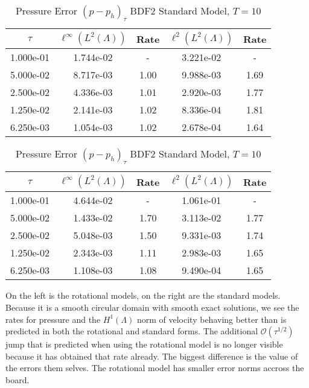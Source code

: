 \documentclass[letterpaper]{erdc}
\begin{document}
\begin{table}[h!]
  \parbox{.45\linewidth}{
  \tiny
  \centering
    \caption{Pressure Error $(p - p_h)_{\tau}$ BDF2 Rotational Model, $T=10$}
    \begin{tabular}{c|c|c|c|c}
      $\tau$ &  $\ell^{\infty}\left(L^2(\Lambda)\right)$ &  Rate  &  $\ell^2\left(L^2(\Lambda)\right)$  &  Rate\\
      \hline
      1.000e-01 & 1.744e-02 &   -  & 3.221e-02 &   - \\
      5.000e-02 & 8.717e-03 & 1.00 & 9.988e-03 & 1.69\\
      2.500e-02 & 4.336e-03 & 1.01 & 2.920e-03 & 1.77\\
      1.250e-02 & 2.141e-03 & 1.02 & 8.336e-04 & 1.81\\
      6.250e-03 & 1.054e-03 & 1.02 & 2.678e-04 & 1.64
    \end{tabular}
    }
    \hfill
    \parbox{.45\linewidth}{
    \tiny
    \centering
      \caption{Pressure Error $(p - p_h)_{\tau}$ BDF2 Standard Model, $T=10$}
      \begin{tabular}{c|c|c|c|c}\label{table:lastconvergenceresult}
        $\tau$ &  $\ell^{\infty}\left(L^2(\Lambda)\right)$ &  Rate  &  $\ell^2\left(L^2(\Lambda)\right)$  &  Rate\\
        \hline
        1.000e-01 & 4.644e-02 &   -  & 1.061e-01 &   - \\
        5.000e-02 & 1.433e-02 & 1.70 & 3.113e-02 & 1.77\\
        2.500e-02 & 5.048e-03 & 1.50 & 9.331e-03 & 1.74\\
        1.250e-02 & 2.343e-03 & 1.11 & 2.983e-03 & 1.65\\
        6.250e-03 & 1.108e-03 & 1.08 & 9.490e-04 & 1.65
      \end{tabular}
    }
\end{table}


On the left is the rotational models,  on the right are the standard models.  Because it is a smooth circular domain with smooth exact solutions, we see the rates for pressure and the $H^1(\Lambda)$ norm of velocity behaving better than is predicted in both the rotational and standard forms.  The additional $\mathcal{O}(\tau^{1/2})$ jump that is predicted when using the rotational model is no longer visible because it has obtained that rate already.  The biggest difference is the value of the errors them selves.  The rotational model has smaller error norms accross the board.
\end{document}
